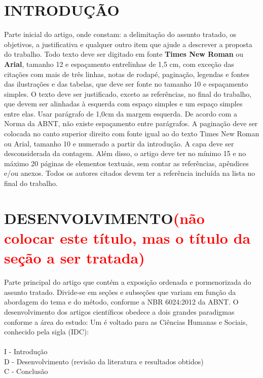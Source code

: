 \documentclass[12pt]{article}
\begin{document}
\vspace{1cm}
\onehalfspacing

\section{INTRODUÇÃO} 
\label{introdução}

Parte inicial do artigo, onde constam: a delimitação do assunto tratado, os objetivos, a justificativa e qualquer outro item que ajude a descrever a proposta do trabalho. 
Todo texto deve ser digitado em fonte \textbf{Times New Roman} ou \textbf{Arial}, tamanho 12 e espaçamento entrelinhas de 1,5 cm, com exceção das citações com mais de três linhas, notas de rodapé, paginação, legendas e fontes das ilustrações e das tabelas, que deve ser fonte no tamanho 10 e espaçamento simples. 
O texto deve ser justificado, exceto as referências, no final do trabalho, que devem ser alinhadas à esquerda com espaço simples e um espaço simples entre elas. 
Usar parágrafo de 1,0cm da margem esquerda. De acordo com a Norma da ABNT, não existe espaçamento entre parágrafos.
A paginação deve ser colocada no canto superior direito com fonte igual ao do texto Times New Roman ou Arial, tamanho 10 e numerado a partir da introdução. A capa deve ser desconsiderada da contagem. Além disso, o artigo deve ter no mínimo 15 e no máximo 20 páginas de elementos textuais, sem contar as referências, apêndices e/ou anexos.
Todos os autores citados devem ter a referência incluída na lista no final do trabalho.


\section{DESENVOLVIMENTO\textcolor{red}{(não colocar este título, mas o título da seção a ser tratada)}} \label{desenvolvimento}

Parte principal do artigo que contém a exposição ordenada e pormenorizada do assunto tratado. Divide-se em seções e subseções que variam em função da abordagem do tema e do método, conforme a NBR 6024:2012 da ABNT. O desenvolvimento dos artigos científicos obedece a dois grandes paradigmas conforme a área do estudo:
Um é voltado para as Ciências Humanas e Sociais, conhecido pela sigla (IDC): \\
\\I
- Introdução
\\D
- Desenvolvimento (revisão da literatura e resultados obtidos)
\\C
- Conclusão
\end{document}
